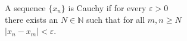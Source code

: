 \documentclass[preview]{standalone}
\begin{document}
\begin{center}
A sequence $\{x_n\}$ is Cauchy if for every $\varepsilon > 0$\\there exists an $N \in \mathbb{N}$ such that for all $m, n \geq N$\\$|x_n - x_m| < \varepsilon$.
\end{center}
\end{document}
